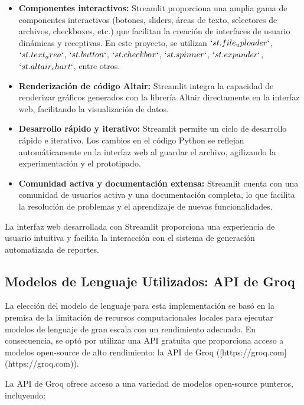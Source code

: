 \begin{itemize}
	\item \textbf{Componentes interactivos:}  Streamlit proporciona una amplia gama de componentes interactivos (botones, sliders, áreas de texto, selectores de archivos, checkboxes, etc.) que facilitan la creación de interfaces de usuario dinámicas y receptivas.  En este proyecto,  se utilizan $`st.file_uploader`$, $`st.text_area`$, $`st.button`$, $`st.checkbox`$, $`st.spinner`$, $`st.expander`$, $`st.altair_chart`$, entre otros.
	\item \textbf{Renderización de código Altair:}  Streamlit integra la capacidad de renderizar gráficos generados con la librería Altair directamente en la interfaz web,  facilitando la visualización de datos.
	\item \textbf{Desarrollo rápido y iterativo:}  Streamlit permite un ciclo de desarrollo rápido e iterativo.  Los cambios en el código Python se reflejan automáticamente en la interfaz web al guardar el archivo,  agilizando la experimentación y el prototipado.
	\item \textbf{Comunidad activa y documentación extensa:}  Streamlit cuenta con una comunidad de usuarios activa y una documentación completa,  lo que facilita la resolución de problemas y el aprendizaje de nuevas funcionalidades.
\end{itemize}
La interfaz web desarrollada con Streamlit proporciona una experiencia de usuario intuitiva y facilita la interacción con el sistema de generación automatizada de reportes.

\subsection{Modelos de Lenguaje Utilizados: API de Groq}

La elección del modelo de lenguaje para esta implementación se basó en la premisa de la limitación de recursos computacionales locales para ejecutar modelos de lenguaje de gran escala con un rendimiento adecuado.  En consecuencia,  se optó por utilizar una API gratuita que proporciona acceso a modelos open-source de alto rendimiento: la API de Groq ([https://groq.com](https://groq.com)).

La API de Groq ofrece acceso a una variedad de modelos open-source punteros,  incluyendo:

